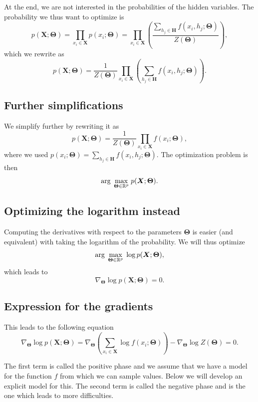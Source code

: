 \documentclass[%
oneside,                 %
final,                   %
10pt]{article}
\begin{document}
At the end, we are not interested in the probabilities of the hidden variables. The probability we thus want to optimize is 
\[
p(\bm{X};\bm{\Theta})=\prod_{x_i\in \bm{X}}p(x_i;\bm{\Theta})=\prod_{x_i\in \bm{X}}\left(\frac{\sum_{h_j\in \bm{H}}f(x_i,h_j;\bm{\Theta})}{Z(\bm{\Theta})}\right),
\]
which we rewrite as
\[
p(\bm{X};\bm{\Theta})=\frac{1}{Z(\bm{\Theta})}\prod_{x_i\in \bm{X}}\left(\sum_{h_j\in \bm{H}}f(x_i,h_j;\bm{\Theta})\right).
\]

\subsection{Further simplifications}

We simplify further by rewriting it as
\[
p(\bm{X};\bm{\Theta})=\frac{1}{Z(\bm{\Theta})}\prod_{x_i\in \bm{X}}f(x_i;\bm{\Theta}),
\]
where we used $p(x_i;\bm{\Theta}) = \sum_{h_j\in \bm{H}}f(x_i,h_j;\bm{\Theta})$.
The optimization problem is then
\[
{\displaystyle \mathrm{arg} \hspace{0.1cm}\max_{\bm{\bm{\Theta}}\in {\mathbb{R}}^{p}}} \hspace{0.1cm}p(\bm{X};\bm{\Theta}).
\]

\subsection{Optimizing the logarithm instead}

Computing the derivatives with respect to the parameters $\bm{\Theta}$ is
easier (and equivalent) with taking the logarithm of the
probability. We will thus optimize
\[
{\displaystyle \mathrm{arg} \hspace{0.1cm}\max_{\bm{\bm{\Theta}}\in {\mathbb{R}}^{p}}} \hspace{0.1cm}\log{p(\bm{X};\bm{\Theta})},
\]
which leads to
\[
\nabla_{\bm{\Theta}}\log{p(\bm{X};\bm{\Theta})}=0.
\]

\subsection{Expression for the gradients}
This leads to the following equation
\[
\nabla_{\bm{\Theta}}\log{p(\bm{X};\bm{\Theta})}=\nabla_{\bm{\Theta}}\left(\sum_{x_i\in \bm{X}}\log{f(x_i;\bm{\Theta})}\right)-\nabla_{\bm{\Theta}}\log{Z(\bm{\Theta})}=0.
\]

The first term is called the positive phase and we assume that we have a model for the function $f$ from which we can sample values. Below we will develop an explicit model for this.
The second term is called the negative phase and is the one which leads to more difficulties.
\end{document}
